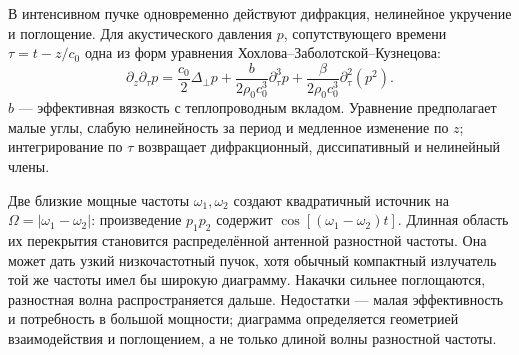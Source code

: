 
В интенсивном пучке одновременно действуют дифракция, нелинейное укручение и поглощение. Для акустического давления $p$, сопутствующего времени $\tau=t-z/c_0$ одна из форм уравнения Хохлова–Заболотской–Кузнецова:
\begin{equation}
 \partial_z\partial_\tau p=\frac{c_0}{2}\Delta_\perp p+
 \frac{b}{2\rho_0c_0^3}\partial_\tau^3p+
 \frac{\beta}{2\rho_0c_0^3}\partial_\tau^2(p^2).
\end{equation}
$b$ — эффективная вязкость с теплопроводным вкладом. Уравнение предполагает малые углы, слабую нелинейность за период и медленное изменение по $z$; интегрирование по $\tau$ возвращает дифракционный, диссипативный и нелинейный члены.

Две близкие мощные частоты $\omega_1,\omega_2$ создают квадратичный источник на $\Omega=|\omega_1-\omega_2|$: произведение $p_1p_2$ содержит $\cos[(\omega_1-\omega_2)t]$. Длинная область их перекрытия становится распределённой антенной разностной частоты. Она может дать узкий низкочастотный пучок, хотя обычный компактный излучатель той же частоты имел бы широкую диаграмму. Накачки сильнее поглощаются, разностная волна распространяется дальше. Недостатки — малая эффективность и потребность в большой мощности; диаграмма определяется геометрией взаимодействия и поглощением, а не только длиной волны разностной частоты.
